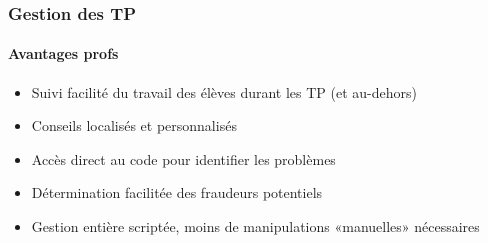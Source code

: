 \begin{frame}
	\frametitle{Gestion des TP}
	\framesubtitle{Avantages profs}

	\begin{itemize}[<+->]
		\item Suivi facilité du travail des élèves durant les TP (et au-dehors)

		\item Conseils localisés et personnalisés

		\item Accès direct au code pour identifier les problèmes

		\item Détermination facilitée des fraudeurs potentiels

		\item Gestion entière scriptée, moins de manipulations «manuelles» nécessaires

	\end{itemize}

\end{frame}
